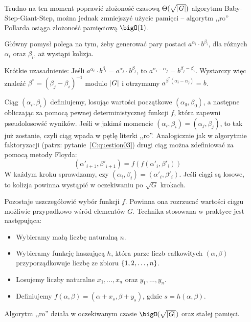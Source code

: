 Trudno na ten moment poprawić złożoność czasową \( \Theta(\sqrt{\left\lvert G\right\rvert}) \) algorytmu Baby-Step-Giant-Step, można jednak zmniejszyć użycie pamięci -- algorytm ,,ro'' Pollarda osiąga złożoność pamięciową \( \bigO(1) \).

Główny pomysł polega na tym, żeby generować pary postaci \( a^{\alpha_i} \cdot b^{\beta_i} \), dla różnych \( \alpha_i \) oraz \( \beta_i \), aż wystąpi kolizja.

Krótkie uzasadnienie: Jeśli \( a^{\alpha_i} \cdot b^{\beta_i} = a^{\alpha_j} \cdot b^{\beta_j} \), to \( a^{\alpha_i - \alpha_j} = b^{\beta_j - \beta_i} \). Wystarczy więc znaleźć \( \beta^{*} = (\beta_j - \beta_i)^{-1} \) modulo \( \left\lvert G\right\rvert \) i otrzymamy \( a^{\beta^{*} (\alpha_i - \alpha_j)} = b \).

Ciąg \( (\alpha_i, \beta_i) \) definiujemy, losując wartości początkowe \( (\alpha_0, \beta_0) \), a następne obliczając za pomocą pewnej deterministycznej funkcji \( f \), która zapewni pseudolosowść wyników.
Jeśli w jakimś momencie \( (\alpha_i, \beta_i) = (\alpha_j, \beta_j) \), to tak już zostanie, czyli ciąg wpada w pętlę literki ,,ro''. Analogicznie jak w algorytmie faktoryzacji (patrz: pytanie~\ref{C:question03}) drugi ciąg można zdefiniować za pomocą metody Floyda:
\[ (\alpha'_{i+1}, \beta'_{i+1}) = f(f(\alpha'_i, \beta'_i)) \]
W każdym kroku sprawdzamy, czy \( (\alpha_i, \beta_i) = (\alpha'_i, \beta'_i) \). Jeśli ciągi są losowe, to kolizja powinna wystąpić w oczekiwaniu po \( \sqrt{G} \) krokach.

Pozostaje uszczegółowić wybór funkcji \( f \). Powinna ona rozrzucać wartości ciągu możliwie przypadkowo wśród elementów \( G \). Technika stosowana w praktyce jest następująca:
\begin{itemize}
    \onehalfspacing
    \item Wybieramy małą liczbę naturalną \( n \).
    \item Wybieramy funkcję haszującą \( h \), która parze liczb całkowitych \( (\alpha, \beta) \) przyporządkowuje liczbę ze zbioru \( \set{1, 2, \dots, n} \).
    \item Losujemy liczby naturalne \( x_1, \dots, x_n \) oraz \( y_1, \dots, y_n \).
    \item Definiujemy \( f(\alpha, \beta) = (\alpha + x_s, \beta + y_s) \), gdzie \( s = h(\alpha, \beta) \).
\end{itemize}

Algorytm ,,ro'' działa w oczekiwanym czasie \( \bigO(\sqrt{\abs{G}}) \) oraz stałej pamięci.